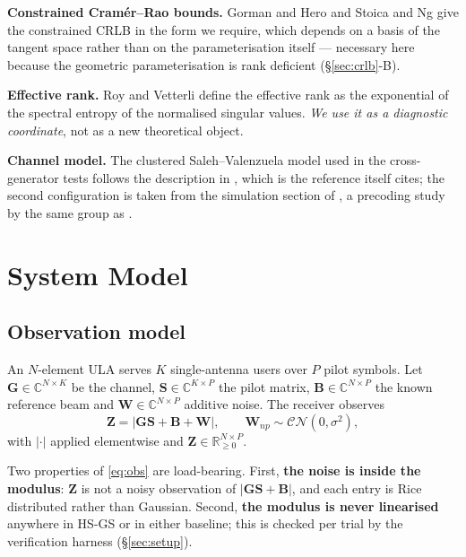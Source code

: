 \documentclass[journal]{IEEEtran}
\newcommand{\bG}{\mathbf{G}}
\newcommand{\bS}{\mathbf{S}}
\newcommand{\bB}{\mathbf{B}}
\newcommand{\bW}{\mathbf{W}}
\newcommand{\bZ}{\mathbf{Z}}
\newcommand{\CN}{\mathcal{CN}}
\begin{document}
\textbf{Constrained Cram\'er--Rao bounds.} Gorman and Hero \cite{gorman1990}
and Stoica and Ng \cite{stoica1998} give the constrained CRLB in the form we
require, which depends on a basis of the tangent space rather than on the
parameterisation itself --- necessary here because the geometric
parameterisation is rank deficient (\S\ref{sec:crlb}-B).

\textbf{Effective rank.} Roy and Vetterli \cite{royvetterli2007} define the
effective rank as the exponential of the spectral entropy of the normalised
singular values. \emph{We use it as a diagnostic coordinate}, not as a new
theoretical object.

\textbf{Channel model.} The clustered Saleh--Valenzuela model used in the
cross-generator tests follows the description in \cite{meijerink2014}, which is
the reference \cite{xiao2026} itself cites; the second configuration is taken
from the simulation section of \cite{precoding2408}, a precoding study by the
same group as \cite{cui2025}.

\section{System Model}\label{sec:model}

\subsection{Observation model}

An $N$-element ULA serves $K$ single-antenna users over $P$ pilot symbols. Let
$\bG\in\mathbb{C}^{N\times K}$ be the channel, $\bS\in\mathbb{C}^{K\times P}$
the pilot matrix, $\bB\in\mathbb{C}^{N\times P}$ the known reference beam and
$\bW\in\mathbb{C}^{N\times P}$ additive noise. The receiver observes
\begin{equation}\label{eq:obs}
\bZ=\bigl|\bG\bS+\bB+\bW\bigr|,\qquad \bW_{np}\sim\CN(0,\sigma^2),
\end{equation}
with $|\cdot|$ applied elementwise and $\bZ\in\mathbb{R}_{\ge0}^{N\times P}$.

Two properties of \eqref{eq:obs} are load-bearing. First, \textbf{the noise is
inside the modulus}: $\bZ$ is not a noisy observation of $|\bG\bS+\bB|$, and
each entry is Rice distributed rather than Gaussian. Second, \textbf{the
modulus is never linearised} anywhere in HS-GS or in either baseline; this is
checked per trial by the verification harness (\S\ref{sec:setup}).
\end{document}
